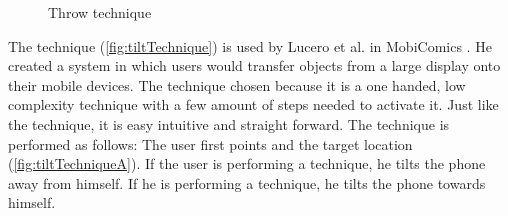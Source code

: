 \begin{figure}[H]
	\caption{Throw technique}
	\label{fig:throwTechnique}
\end{figure}

The \tilt technique (\cref{fig:tiltTechnique}) is used by Lucero et al. in MobiComics \cite{Lucero:2012}.
He created a system in which users would transfer objects from a large display onto their mobile devices.
The \throw technique chosen because it is a one handed, low complexity technique with a few amount of steps needed to activate it. 
Just like the \swipe technique, it is easy intuitive and straight forward. 
The \tilt technique is performed as follows:
The user first points and the target location (\cref{fig:tiltTechniqueA}).
If the user is performing a \push technique, he tilts the phone away from himself.
If he is performing a \pull technique, he tilts the phone towards himself. 

